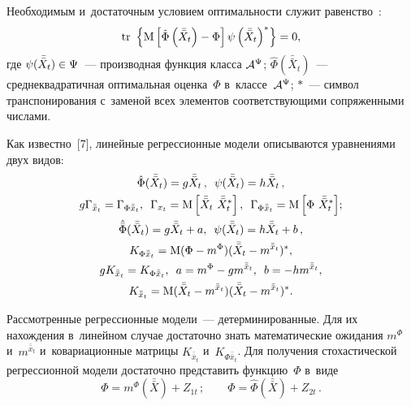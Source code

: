 \begin{multicols}{2}
Необходимым и~достаточным условием оптимальности служит равенство~\cite{7-sin}:
    \begin{equation*}
    \mathrm{tr}\ \left\{ \mathrm{M} \left[ \hat\Phi \left(\bar{\bar X}_t\right) - \Phi\right] \psi
    \left(\bar{\bar X}_t\right)^*\right\} =0,
    \end{equation*}
где $\psi(\bar{\bar X}_t)\hm\in \Psi$~--- производная функция класса ${\cal A}^\Psi$; 
$\hat\Phi(\bar{\bar X}_t)$~--- среднеквадратичная  оптимальная оценка~$\Phi$ в~классе~${\cal A}^\Psi$; 
$*$~--- символ транспонирования с~заменой всех элементов соответствующими сопряженными числами.

Как известно~[7], линейные регрессионные модели описываются уравнениями двух видов:
\begin{gather*}
\hat\Phi(\bar{\bar X}_t) = g \bar{\bar X}_t\,, \enskip \psi (\bar{\bar X}_t) = h \bar{\bar X}_t\,,
   \\
    g\Gamma_{\bar{\bar x}_t} = \Gamma_{\Phi \bar{\bar x}_t}, \enskip 
    \Gamma_{x_t} = \mathrm{M} \left[ \bar{\bar X}_t \ \bar{\bar X}_t^*\right], \enskip 
    \Gamma_{\Phi \bar{\bar x}_t} = 
    \mathrm{M} \left[ \Phi\ \bar{\bar X}_t^*\right]\!;
   \\
    \hat{\bar \Phi} (\bar{\bar X}_t) = g\bar{\bar X}_t + a,\enskip 
    \psi (\bar{\bar X}_t) = h \bar{\bar X}_t +b\,, 
   \\
    K_{\Phi \bar{\bar x}_t}= 
    \mathrm{M} (\Phi -m^\Phi)(\bar{\bar X}_t -m^{\bar{\bar x}_t})^*,
   \\
    gK_{\bar{\bar x}_t} = K_{\Phi \bar{\bar x}_t},\enskip 
    a= m^\Phi - g m^{\bar{\bar x}_t}, \enskip  
    b= -h m^{\bar{\bar x}_t},\\
    K_{\bar{\bar x}_t} = 
    \mathrm{M} (\bar{\bar X}_t- m^{\bar{\bar x}_t})(\bar{\bar X}_t -m^{\bar{\bar x}_t})^*.
\end{gather*}

Рассмотренные регрессионные модели~--- детерминированные. Для их нахождения в~линейном случае 
достаточно знать математические ожидания $m^\Phi$ и~$m^{\bar{\bar x}_t}$ и~ковариационные 
матрицы $K_{\bar{\bar x}_t}$ и~$K_{\Phi \bar{\bar x}_t}$. Для получения стохастической 
регрессионной модели достаточно представить функцию~$\Phi$ в~виде
   \begin{equation*}
   \Phi = m^\Phi (\bar{\bar X}) + Z_{1t}\,; %
   \qquad
\Phi = \hat\Phi(\bar{\bar X})+Z_{2t}\,. %
\end{equation*}


\end{multicols}
